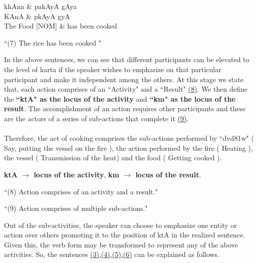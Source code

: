 \documentclass[twoside]{article}
\begin{document}
\hypertarget{fig7}{}
\begin{center}
\begin{dependency}[arc edge, arc angle=80, text only label, label style={above}]
   \begin{deptext}[column sep=1em]
      
      khAna \& pakAyA gAya \\
      {\dn KAnA} \& {\dn pkAyA gyA} \\      
      The Food [NOM] \& has been cooked \\
   \end{deptext}
   
\end{dependency} 

 ``(7) The rice has been cooked " 
 

\end{center}
In the above sentences, we can see that different participants can be elevated to the level of karta if the speaker wishes to emphasize on that particular participant and make it independent among the others. 
At this stage we state that, each action comprises of an ``Activity" and a ``Result" \hyperlink{fig8}{(8)}. We then define the \textbf{``{\dn ktA\0}" as the locus of the activity} and \textbf{``{\dn km\0}" as the locus of the result}. 
The accomplishment of an action requires other participants and these are the actors of a series of sub-actions that complete it \hyperlink{fig9}{(9)}. 
\\ \\  Therefore, the act of cooking comprises the sub-actions performed by ``{\dn d\?vd\381w}" ( Say, putting the vessel on the fire ), the action performed by the fire ( Heating ), the vessel ( Transmission of the heat) and the food ( Getting cooked ). 


\begin{center}

\begin{mdframed}[style=MyFrame2]
\begin{center}


\textbf{{\dn ktA\0} $\rightarrow$ locus of the activity}, 
\textbf{{\dn km\0} $\rightarrow$ locus of the result}.


\end{center}

\end{mdframed}

``(8) Action comprises of an activity and a result."

``(9) Action comprises of multiple sub-actions."
\end{center}
Out of the sub-activities, the speaker can choose to emphasize one entity or action over others promoting it to the position of {\dn ktA\0} in the realized sentence.
Given this, the verb form may be transformed to represent any of the above activities. So, the sentences \hyperlink{fig3}{(3)},\hyperlink{fig4}{(4)},\hyperlink{fig5}{(5)},\hyperlink{fig6}{(6)} can be explained as follows.
\end{document}
